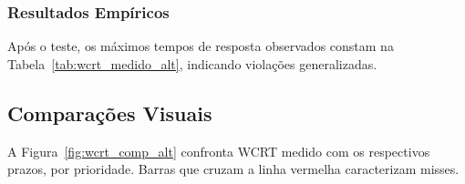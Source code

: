 \documentclass[conference]{IEEEtran}
\begin{document}
\subsubsection{Resultados Empíricos}
Após o teste, os máximos tempos de resposta observados constam na Tabela~\ref{tab:wcrt_medido_alt}, indicando violações generalizadas.

\begin{table}[H]
\caption{WCRT Máximo Observado por Tarefa}
\begin{center}
\label{tab:wcrt_medido_alt}
\end{center}
\end{table}

\subsection{Comparações Visuais}
A Figura~\ref{fig:wcrt_comp_alt} confronta WCRT medido com os respectivos prazos, por prioridade. Barras que cruzam a linha vermelha caracterizam misses.
\end{document}
